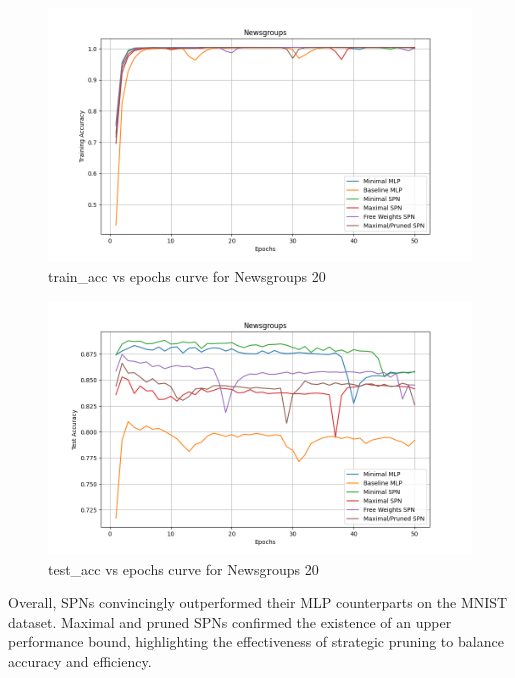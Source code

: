 \begin{figure}[H]
    \centering
    \includegraphics[width=\linewidth]{Figures/Results/Newsgroups/training_accuracy_plot.png} %
    \captionsetup{width=\linewidth}
    \caption{train\_acc vs epochs curve for Newsgroups 20}
    \label{fig:newsgroupsTrainCurve}
\end{figure}

\begin{figure}[H]
    \centering
    \includegraphics[width=\linewidth]{Figures/Results/Newsgroups/test_accuracy_plot.png} %
    \captionsetup{width=\linewidth}
    \caption{test\_acc vs epochs curve for Newsgroups 20}
    \label{fig:newsgroupsTestCurve}
\end{figure}

Overall, SPNs convincingly outperformed their MLP counterparts on the MNIST dataset. Maximal and pruned SPNs confirmed the existence of an upper performance bound, highlighting the effectiveness of strategic pruning to balance accuracy and efficiency.

